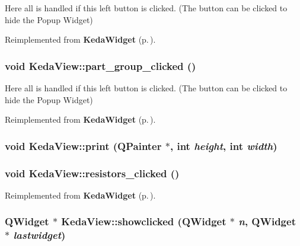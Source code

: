 Here all is handled if this left button is clicked. (The button can be clicked to hide the Popup Widget) 

Reimplemented from {\bf Keda\-Widget} {\rm (p.\,\pageref{classKedaWidget_7dc5bfb70b7714e6dc7467e68b0531e7})}.
\subsubsection{\setlength{\rightskip}{0pt plus 5cm}void Keda\-View::part\_\-group\_\-clicked ()\hspace{0.3cm}{\tt  [virtual, slot]}}\label{classKedaView_cddd3db58b35c85df11cd5c7f98a6994}


Here all is handled if this left button is clicked. (The button can be clicked to hide the Popup Widget) 

Reimplemented from {\bf Keda\-Widget} {\rm (p.\,\pageref{classKedaWidget_cddd3db58b35c85df11cd5c7f98a6994})}.
\subsubsection{\setlength{\rightskip}{0pt plus 5cm}void Keda\-View::print (QPainter $\ast$, int {\em height}, int {\em width})\hspace{0.3cm}{\tt  [slot]}}\label{classKedaView_049cd1d13f85a362dcd3c318f3b4c5b0}


\subsubsection{\setlength{\rightskip}{0pt plus 5cm}void Keda\-View::resistors\_\-clicked ()\hspace{0.3cm}{\tt  [virtual, slot]}}\label{classKedaView_04192481274926e08d1f2e632022eb4d}




Reimplemented from {\bf Keda\-Widget} {\rm (p.\,\pageref{classKedaWidget_04192481274926e08d1f2e632022eb4d})}.
\subsubsection{\setlength{\rightskip}{0pt plus 5cm}QWidget $\ast$ Keda\-View::showclicked (QWidget $\ast$ {\em n}, QWidget $\ast$ {\em lastwidget})\hspace{0.3cm}{\tt  [slot]}}\label{classKedaView_0cb44ebe8949a21dc794475aa23e6312}



